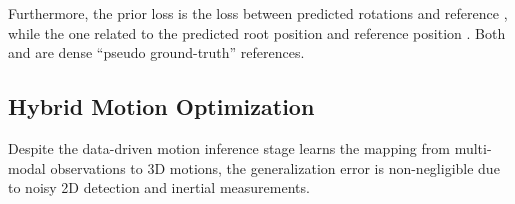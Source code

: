 \documentclass[letterpaper]{article} \usepackage{aaai23}  \usepackage{times}  \usepackage{helvet}  \usepackage{courier}  \usepackage[hyphens]{url}  \usepackage{graphicx} \urlstyle{rm} \def\UrlFont{\rm}  \usepackage{natbib}  \usepackage{caption} \frenchspacing  \setlength{\pdfpagewidth}{8.5in}  \setlength{\pdfpageheight}{11in}  \usepackage{algorithm}
\begin{document}
Furthermore, the prior loss  is the  loss between predicted rotations  and reference , while  the one related to the predicted root position  and reference position .
Both  and  are dense ``pseudo ground-truth'' references. 







 \begin{table*}[th]
	\begin{center}
		\centering
		
        \caption{Quantitative comparison of several previous state-of-the-art methods in terms of tracking accuracy and plausibility. }
		\label{tab:Comparison}
	\end{center}
	\vspace{-3mm}
\end{table*}

\subsection{Hybrid Motion Optimization}
\label{sec:mot_optimization}



Despite the data-driven motion inference stage learns the mapping from multi-modal observations to 3D motions, the generalization error is non-negligible due to noisy 2D detection and inertial measurements. 
\end{document}

